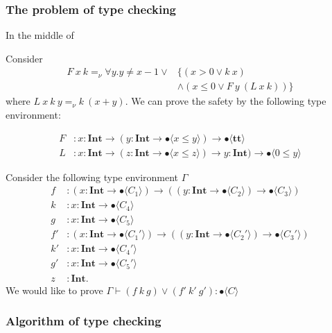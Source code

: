 \documentclass[runningheads]{llncs}
\newcommand \true {\textbf{tt}}
\newcommand \stypeint {\textbf{Int}}
\newcommand \stypebool {\bullet}
\newcommand \typeint[1]{{#1} : \stypeint}
\newcommand \typebool[1]{\stypebool \langle #1 \rangle}
\begin{document}
\subsubsection{The problem of type checking}

In the middle of

Consider
\begin{align*}
    F\ x\ k =_\nu \forall y. y \neq x - 1 \lor
        & \{ (x > 0 \lor k\ x)\\
        & \land ( x \leq 0 \lor F\ y\ (L\ x\ k)) \}
\end{align*}
where \( L\ x\ k\ y =_\nu k\ (x + y) \).
We can prove the safety by the following type environment:

\begin{align*}
    F&: \typeint{x} \to (\typeint{y} \to \typebool{x \leq y}) \to
    \typebool{\true}\\
    L&: \typeint{x} \to (\typeint{z} \to \typebool{x \leq z}) \to
    \typeint{y}) \to \typebool{0 \leq y}
\end{align*}

Consider the following type environment \(\Gamma\)
\begin{align*}
    f&: (\typeint{x} \to \typebool{C_1}) \to ((\typeint{y} \to \typebool{C_2})
    \to \typebool{C_3})\\
    k&: \typeint{x} \to \typebool{C_4}\\
    g&: \typeint{x} \to \typebool{C_5}\\
    f'&: (\typeint{x} \to \typebool{C_1'}) \to ((\typeint{y} \to \typebool{C_2'})
    \to \typebool{C_3'})\\
    k'&: \typeint{x} \to \typebool{C_4'}\\
    g'&: \typeint{x} \to \typebool{C_5'}\\
    z&: \stypeint.
\end{align*}
We would like to prove \( \Gamma \vdash (f\ k\ g) \lor (f'\ k'\ g'):
\typebool{C}\)


\subsubsection{Algorithm of type checking}
\end{document}
